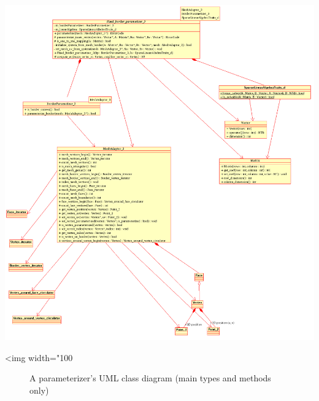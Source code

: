 \begin{center}
    \label{Surface_mesh_parameterization-fig-parameterizer_class_diagram}
    \begin{ccTexOnly}
        \includegraphics[width=1.1\textwidth]{Surface_mesh_parameterization/parameterizer_class_diagram}
    \end{ccTexOnly}
    \begin{ccHtmlOnly}
        <img width="100%
    \end{ccHtmlOnly}
    \begin{figure}[h]
        \caption{A parameterizer's UML class diagram (main types and methods only)}
    \end{figure}
\end{center}

